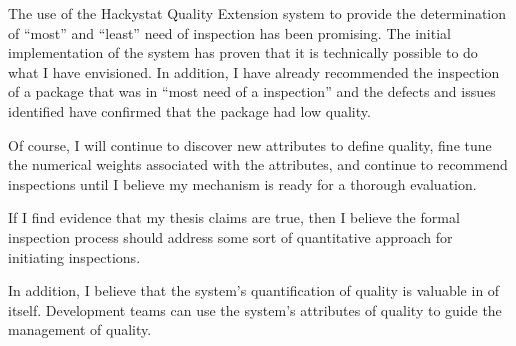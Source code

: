 \documentclass[11pt,twocolumn]{article}
\begin{document}
The use of the Hackystat Quality Extension system to provide the
determination of ``most'' and ``least'' need of inspection has been promising.
The initial implementation of the system has proven that it is technically
possible to do what I have envisioned. In addition, I have already
recommended the inspection of a package that was in ``most need of a inspection''
and the defects and issues identified have confirmed that the package had
low quality.

Of course, I will continue to discover new attributes to define quality,
fine tune the numerical weights associated with the attributes, and
continue to recommend inspections until I believe my mechanism is ready for a
thorough evaluation.

If I find evidence that my thesis claims are true, then I believe the
formal inspection process should address some sort of quantitative approach
for initiating inspections.

In addition, I believe that the system's quantification of quality is
valuable in of itself. Development teams can use the system's attributes of
quality to guide the management of quality.



\end{document}
